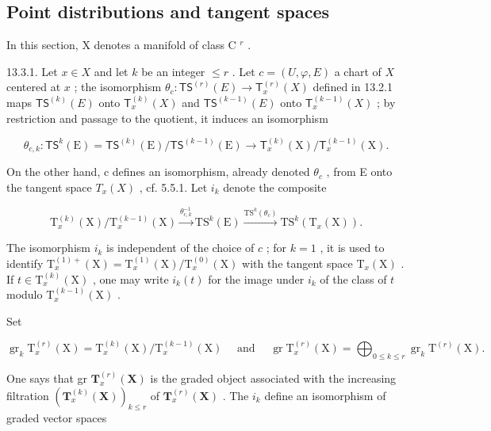 \subsection{Point distributions and tangent spaces}

In this section, X denotes a manifold of class C \(^{r}\) .

13.3.1. Let \(x \in X\) and let \(k\) be an integer \(\leqslant r\) . Let \(c = (U, \varphi, E)\) a chart of \(X\) centered at \(x\) ; the isomorphism \(\theta_c \colon \mathsf{TS}^{(r)}(E) \to \mathsf{T}_x^{(r)}(X)\) defined in 13.2.1 maps \(\mathsf{TS}^{(k)}(E)\) onto \(\mathsf{T}_x^{(k)}(X)\) and \(\mathsf{TS}^{(k-1)}(E)\) onto \(\mathsf{T}_x^{(k-1)}(X)\) ; by restriction and passage to the quotient, it induces an isomorphism

\[
\theta_ {c, k} \colon \mathsf {T S} ^ {k} (\mathrm{E}) = \mathsf {T S} ^ {(k)} (\mathrm{E}) / \mathsf {T S} ^ {(k - 1)} (\mathrm{E}) \rightarrow \mathsf {T} _ {x} ^ {(k)} (\mathrm{X}) / \mathsf {T} _ {x} ^ {(k - 1)} (\mathrm{X}).
\]

On the other hand, c defines an isomorphism, already denoted \(\theta_{c}\) , from E onto the tangent space \(T_{x}(X)\) , cf. 5.5.1. Let \(i_{k}\) denote the composite

\[
\mathrm{T} _ {x} ^ {(k)} (\mathrm{X}) / \mathrm{T} _ {x} ^ {(k - 1)} (\mathrm{X}) \xrightarrow {\theta_ {c , k} ^ {- 1}} \mathrm{TS} ^ {k} (\mathrm{E}) \xrightarrow {\mathrm{TS} ^ {k} (\theta_ {c})} \mathrm{TS} ^ {k} (\mathrm{T} _ {x} (\mathrm{X})).
\]

The isomorphism \(i_k\) is independent of the choice of \(c\) ; for \(k = 1\) , it is used to identify \(\mathrm{T}_x^{(1)+}(\mathrm{X}) = \mathrm{T}_x^{(1)}(\mathrm{X}) / \mathrm{T}_x^{(0)}(\mathrm{X})\) with the tangent space \(\mathrm{T}_x(\mathrm{X})\) . If \(t \in \mathrm{T}_x^{(k)}(\mathrm{X})\) , one may write \(i_k(t)\) for the image under \(i_k\) of the class of \(t\) modulo \(\mathrm{T}_x^{(k-1)}(\mathrm{X})\) .

Set

\[
\operatorname{gr} _ {k} \mathrm{T} _ {x} ^ {(r)} (\mathrm{X}) = \mathrm{T} _ {x} ^ {(k)} (\mathrm{X}) / \mathrm{T} _ {x} ^ {(k - 1)} (\mathrm{X}) \quad \text { and } \quad \operatorname{gr} \mathrm{T} _ {x} ^ {(r)} (\mathrm{X}) = \bigoplus_ {0 \leqslant k \leqslant r} \operatorname{gr} _ {k} \mathrm{T} ^ {(r)} (\mathrm{X}).
\]

One says that gr \(\mathbf{T}_{x}^{(r)}(\mathbf{X})\) is the graded object associated with the increasing filtration \((\mathbf{T}_{x}^{(k)}(\mathbf{X}))_{k\leq r}\) of \(\mathbf{T}_{x}^{(r)}(\mathbf{X})\) . The \(i_k\) define an isomorphism of graded vector spaces

